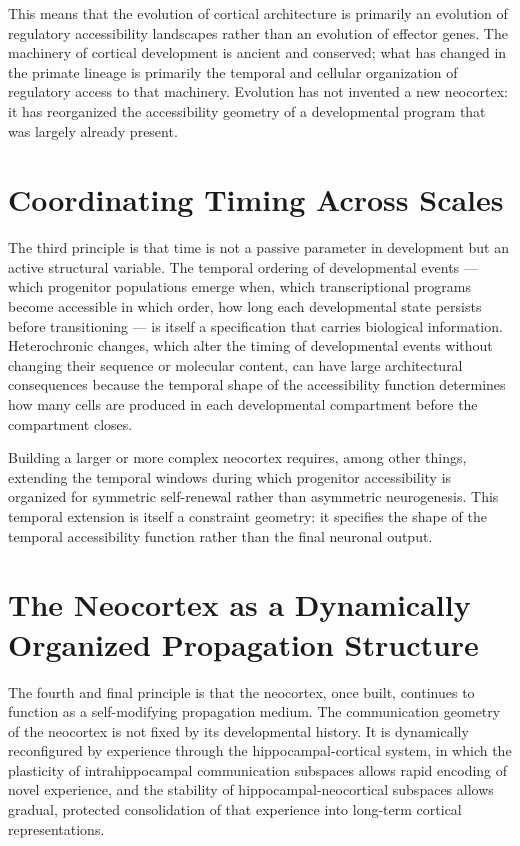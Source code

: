 \documentclass[12pt, a4paper, openany]{book}
\theoremstyle{definition}
\theoremstyle{remark}
\begin{document}
This means that the evolution of cortical architecture is primarily an evolution of regulatory accessibility landscapes rather than an evolution of effector genes. The machinery of cortical development is ancient and conserved; what has changed in the primate lineage is primarily the temporal and cellular organization of regulatory access to that machinery. Evolution has not invented a new neocortex: it has reorganized the accessibility geometry of a developmental program that was largely already present.

\section{Coordinating Timing Across Scales}

The third principle is that time is not a passive parameter in development but an active structural variable. The temporal ordering of developmental events — which progenitor populations emerge when, which transcriptional programs become accessible in which order, how long each developmental state persists before transitioning — is itself a specification that carries biological information. Heterochronic changes, which alter the timing of developmental events without changing their sequence or molecular content, can have large architectural consequences because the temporal shape of the accessibility function determines how many cells are produced in each developmental compartment before the compartment closes.

Building a larger or more complex neocortex requires, among other things, extending the temporal windows during which progenitor accessibility is organized for symmetric self-renewal rather than asymmetric neurogenesis. This temporal extension is itself a constraint geometry: it specifies the shape of the temporal accessibility function rather than the final neuronal output.

\section{The Neocortex as a Dynamically Organized Propagation Structure}

The fourth and final principle is that the neocortex, once built, continues to function as a self-modifying propagation medium. The communication geometry of the neocortex is not fixed by its developmental history. It is dynamically reconfigured by experience through the hippocampal-cortical system, in which the plasticity of intrahippocampal communication subspaces allows rapid encoding of novel experience, and the stability of hippocampal-neocortical subspaces allows gradual, protected consolidation of that experience into long-term cortical representations.
\end{document}
